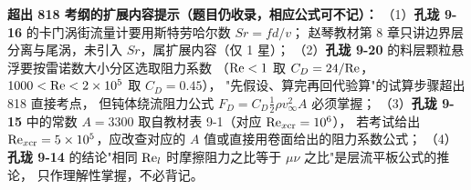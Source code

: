 \begin{tishi}
\textbf{超出 818 考纲的扩展内容提示（题目仍收录，相应公式可不记）：}
（1）\textbf{孔珑 9-16} 的卡门涡街流量计要用斯特劳哈尔数 $Sr=fd/v$；
赵琴教材第 8 章只讲边界层分离与尾涡，未引入 $Sr$，属扩展内容（仅 1 星）；
（2）\textbf{孔珑 9-20} 的料层颗粒悬浮要按雷诺数大小分区选取阻力系数
（$\mathrm{Re}<1$ 取 $C_D=24/\mathrm{Re}$，$1000<\mathrm{Re}<2\times10^{5}$ 取 $C_D=0.45$），
"先假设、算完再回代验算"的试算步骤超出 818 直接考点，
但钝体绕流阻力公式 $F_D=C_D\frac{1}{2}\rho v_\infty^{2}A$ 必须掌握；
（3）\textbf{孔珑 9-15} 中的常数 $A=3300$ 取自教材表 9-1（对应 $\mathrm{Re}_{x\mathrm{cr}}=10^{6}$），
若考试给出 $\mathrm{Re}_{x\mathrm{cr}}=5\times10^{5}$，应改查对应的 $A$ 值或直接用卷面给出的阻力系数公式；
（4）\textbf{孔珑 9-14} 的结论"相同 $\mathrm{Re}_l$ 时摩擦阻力之比等于 $\mu\nu$ 之比"是层流平板公式的推论，
只作理解性掌握，不必背记。
\end{tishi}
